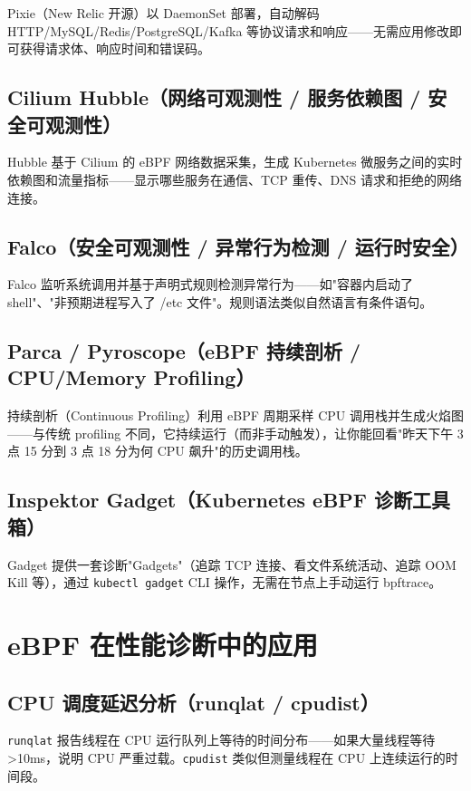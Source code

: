 \documentclass[12pt,UTF8]{ctexbook}
\begin{document}
Pixie（New Relic 开源）以 DaemonSet 部署，自动解码 HTTP/MySQL/Redis/PostgreSQL/Kafka 等协议请求和响应——无需应用修改即可获得请求体、响应时间和错误码。

    \subsection{Cilium Hubble（网络可观测性 / 服务依赖图 / 安全可观测性）}

Hubble 基于 Cilium 的 eBPF 网络数据采集，生成 Kubernetes 微服务之间的实时依赖图和流量指标——显示哪些服务在通信、TCP 重传、DNS 请求和拒绝的网络连接。

    \subsection{Falco（安全可观测性 / 异常行为检测 / 运行时安全）}

Falco 监听系统调用并基于声明式规则检测异常行为——如"容器内启动了 shell"、"非预期进程写入了 /etc 文件"。规则语法类似自然语言有条件语句。

    \subsection{Parca / Pyroscope（eBPF 持续剖析 / CPU/Memory Profiling）}

持续剖析（Continuous Profiling）利用 eBPF 周期采样 CPU 调用栈并生成火焰图——与传统 profiling 不同，它持续运行（而非手动触发），让你能回看"昨天下午 3 点 15 分到 3 点 18 分为何 CPU 飙升"的历史调用栈。

    \subsection{Inspektor Gadget（Kubernetes eBPF 诊断工具箱）}

Gadget 提供一套诊断"Gadgets"（追踪 TCP 连接、看文件系统活动、追踪 OOM Kill 等），通过 \texttt{kubectl gadget} CLI 操作，无需在节点上手动运行 bpftrace。

  \section{eBPF 在性能诊断中的应用}
    \subsection{CPU 调度延迟分析（runqlat / cpudist）}

\texttt{runqlat} 报告线程在 CPU 运行队列上等待的时间分布——如果大量线程等待 >10ms，说明 CPU 严重过载。\texttt{cpudist} 类似但测量线程在 CPU 上连续运行的时间段。
\end{document}
